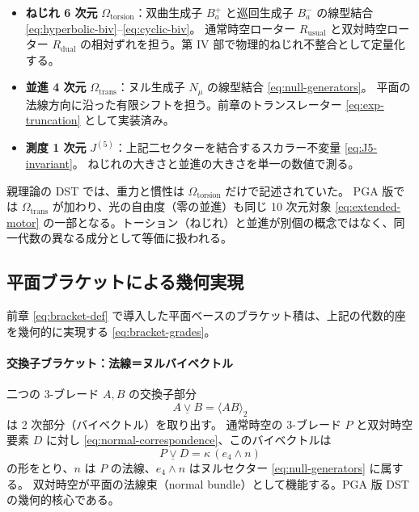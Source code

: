 \documentclass[dvipdfmx,a4paper,oneside]{jsbook}
\numberwithin{equation}{chapter}
\begin{document}
\begin{itemize}[leftmargin=2em]
  \item \textbf{ねじれ 6 次元} \(\Omega_{\mathrm{torsion}}\)：双曲生成子 \(B_a^{+}\) と巡回生成子 \(B_a^{-}\) の線型結合 \eqref{eq:hyperbolic-biv}–\eqref{eq:cyclic-biv}。
  通常時空ローター \(R_{\mathrm{usual}}\) と双対時空ローター \(R_{\mathrm{dual}}\) の相対ずれを担う。第 IV 部で物理的ねじれ不整合として定量化する。
  \item \textbf{並進 4 次元} \(\Omega_{\mathrm{trans}}\)：ヌル生成子 \(N_\mu\) の線型結合 \eqref{eq:null-generators}。
  平面の法線方向に沿った有限シフトを担う。前章のトランスレーター \eqref{eq:exp-truncation} として実装済み。
  \item \textbf{測度 1 次元} \(J^{(5)}\)：上記二セクターを結合するスカラー不変量 \eqref{eq:J5-invariant}。
  ねじれの大きさと並進の大きさを単一の数値で測る。
\end{itemize}

親理論の DST では、重力と慣性は \(\Omega_{\mathrm{torsion}}\) だけで記述されていた。
PGA 版では \(\Omega_{\mathrm{trans}}\) が加わり、光の自由度（零の並進）も同じ 10 次元対象 \eqref{eq:extended-motor} の一部となる。トーション（ねじれ）と並進が別個の概念ではなく、同一代数の異なる成分として等価に扱われる。

\subsection{平面ブラケットによる幾何実現}

前章 \eqref{eq:bracket-def} で導入した平面ベースのブラケット積は、上記の代数的座を幾何的に実現する \eqref{eq:bracket-grades}。

\paragraph{交換子ブラケット：法線＝ヌルバイベクトル}
二つの 3-ブレード \(A, B\) の交換子部分
\begin{equation}
  A \mathbin{\underline{\vee}} B = \langle AB \rangle_2
  \label{eq:bracket-commutator-grade}
\end{equation}
は 2 次部分（バイベクトル）を取り出す。
通常時空の 3-ブレード \(P\) と双対時空要素 \(D\) に対し \eqref{eq:normal-correspondence}、このバイベクトルは
\begin{equation}
  P \mathbin{\underline{\vee}} D = \kappa\,(e_4 \wedge n)
  \label{eq:bracket-normal}
\end{equation}
の形をとり、\(n\) は \(P\) の法線、\(e_4 \wedge n\) はヌルセクター \eqref{eq:null-generators} に属する。
双対時空が平面の法線束（normal bundle）として機能する。PGA 版 DST の幾何的核心である。
\end{document}
